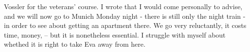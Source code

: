 
Vossler  for the veterans' course. I wrote that I would come personally to advise, and we will now go to Munich Monday night - there is still only the night train - in order to see about getting an apartment there. We go very reluctantly, it costs time, money,  -- but it is nonetheless essential. I struggle with myself about whethed it is right to take Eva away from here.

\missing

